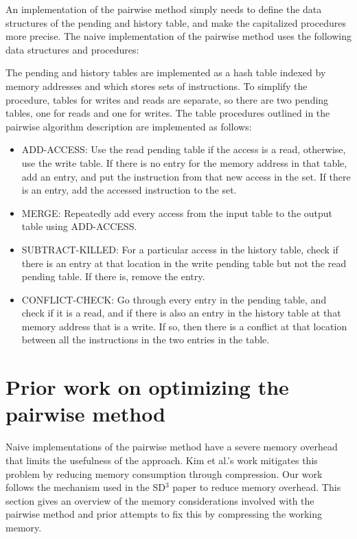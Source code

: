 \documentclass[12pt,twoside]{reedthesis}
\begin{document}
		An implementation of the pairwise method simply needs to define the data structures of the pending and history table, and make the capitalized procedures more precise.	
		The naive implementation of the pairwise method uses the following data structures and procedures:
		
		The pending and history tables are implemented as a hash table indexed by memory addresses and which stores sets of instructions. To simplify the procedure, tables for writes and reads are separate, so there are two pending tables, one for reads and one for writes. The table procedures outlined in the pairwise algorithm description are implemented as follows:
		
		\begin{itemize}
			\item ADD-ACCESS: Use the read pending table if the access is a read, otherwise, use the write table. If there is no entry for the memory address in that table, add an entry, and put the instruction from that new access in the set. If there is an entry, add the accessed instruction to the set. 
			\item MERGE: Repeatedly add every access from the input table to the output table using ADD-ACCESS. 
			\item SUBTRACT-KILLED: For a particular access in the history table, check if there is an entry at that location in the write pending table but not the read pending table. If there is, remove the entry. 
			\item CONFLICT-CHECK: Go through every entry in the pending table, and check if it is a read, and if there is also an entry in the history table at that memory address that is a write. If so, then there is a conflict at that location between all the instructions in the two entries in the table. 
		\end{itemize}
		
		
		
	\section{Prior work on optimizing the pairwise method}\label{s:optimize-pairwise}
		
		Naive implementations of the pairwise method have a severe memory overhead that limits the usefulness of the approach. Kim et al.'s work mitigates this problem by reducing memory consumption through compression. Our work follows the mechanism used in the SD$^3$ paper to reduce memory overhead. This section gives an overview of the memory considerations involved with the pairwise method and prior attempts to fix this by compressing the working memory. 
		
\end{document}
